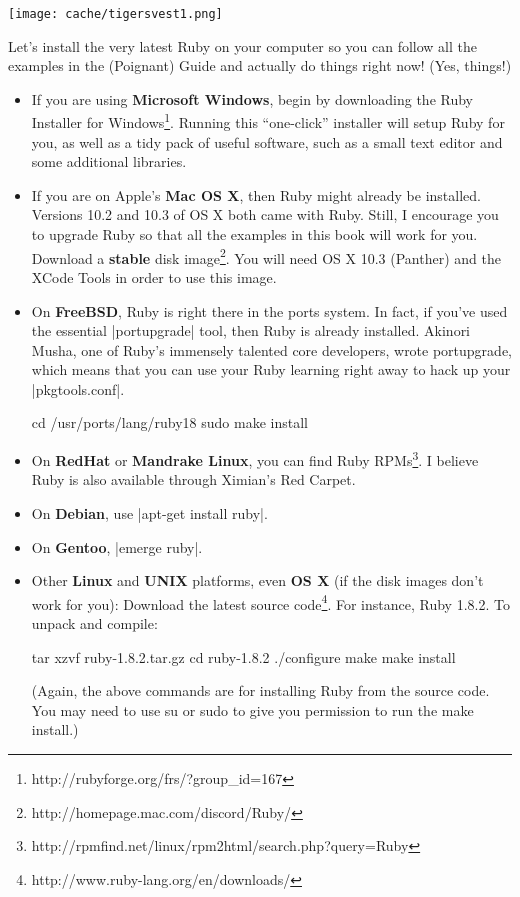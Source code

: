 \documentclass[12pt,twoside]{report}
\begin{document}
\texttt{[image: cache/tigersvest1.png]}
\newpage

Let's install the very latest Ruby on your computer so you can follow
all the examples in the (Poignant) Guide and actually do things right
now! (Yes, things!)

\begin{itemize}

\item 
If you are using \textbf{Microsoft Windows}, begin by downloading the
Ruby Installer for
Windows\footnote{http://rubyforge.org/frs/?group\_id=167}. Running
this ``one-click'' installer will setup Ruby for you, as well as a
tidy pack of useful software, such as a small text editor and some
additional libraries.

\item If you are on Apple's \textbf{Mac OS X}, then
Ruby might already be installed. Versions 10.2 and 10.3 of OS X both
came with Ruby. Still, I encourage you to upgrade Ruby so that all the
examples in this book will work for you. Download a \textbf{stable}
disk image\footnote{http://homepage.mac.com/discord/Ruby/}. You will
need OS X 10.3 (Panther) and the XCode Tools in order to use this
image.

\item On \textbf{FreeBSD}, Ruby is right there in the ports
system. In fact, if you've used the essential
\consoleinline|portupgrade| tool, then Ruby is already
installed. Akinori Musha, one of Ruby's immensely talented core
developers, wrote portupgrade, which means that you can use your Ruby
learning right away to hack up your
\consoleinline|pkgtools.conf|.

\begin{consolecode}
 cd /usr/ports/lang/ruby18 
 sudo make install
\end{consolecode}

\item On \textbf{RedHat} or \textbf{Mandrake Linux}, you can find Ruby
RPMs\footnote{http://rpmfind.net/linux/rpm2html/search.php?query=Ruby}. I
believe Ruby is also available through Ximian's Red Carpet.

\item On \textbf{Debian}, use 
\consoleinline|apt-get install ruby|.

\item On \textbf{Gentoo}, \consoleinline|emerge ruby|.

\item Other \textbf{Linux} and \textbf{UNIX}
platforms, even \textbf{OS X} (if the disk images don't work for you): Download
the latest source code\footnote{http://www.ruby-lang.org/en/downloads/}. 
For instance, Ruby 1.8.2. To unpack and compile:

\begin{consolecode}
 tar xzvf ruby-1.8.2.tar.gz 
 cd ruby-1.8.2 
 ./configure 
 make
 make install
\end{consolecode}

(Again, the above commands are for installing Ruby from the source
code. You may need to use su or sudo to give you permission to run the
make install.)

\end{itemize}
\end{document}
